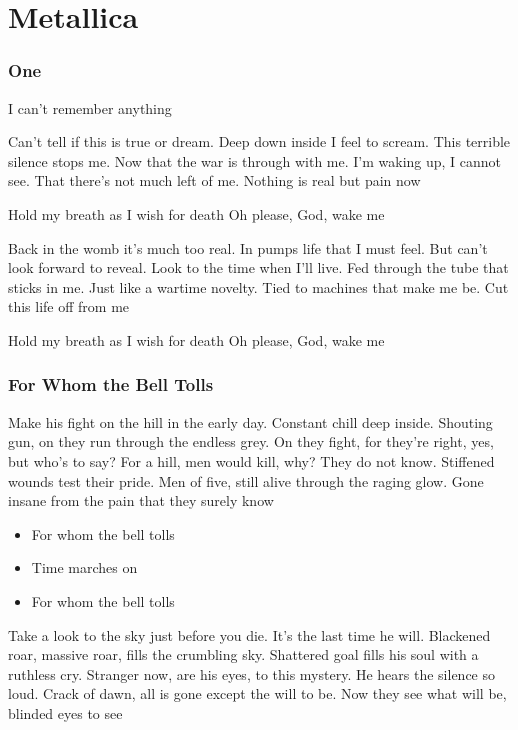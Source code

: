 \documentclass{article}
\begin{document}
\part{Metallica}
\section{One}
I can’t remember anything

Can’t tell if this is true or dream. Deep down inside I feel to scream. This terrible silence stops me. Now that the war is through with me. I’m waking up, I cannot see. That there’s not much left of me. Nothing is real but pain now


Hold my breath as I wish for death
Oh please, God, wake me


Back in the womb it’s much too real. In pumps life that I must feel. But can’t look forward to reveal. Look to the time when I’ll live. Fed through the tube that sticks in me. Just like a wartime novelty. Tied to machines that make me be. Cut this life off from me


Hold my breath as I wish for death
Oh please, God, wake me \cite{green}

\section{For Whom the Bell Tolls}

Make his fight on the hill in the early day. Constant chill deep inside. Shouting gun, on they run through the endless grey. On they fight, for they're right, yes, but who's to say? For a hill, men would kill, why? They do not know. Stiffened wounds test their pride. Men of five, still alive through the raging glow. Gone insane from the pain that they surely know

\begin{itemize}
\item For whom the bell tolls
\item Time marches on
\item For whom the bell tolls
\end{itemize}

Take a look to the sky just before you die. It's the last time he will. Blackened roar, massive roar, fills the crumbling sky. Shattered goal fills his soul with a ruthless cry. Stranger now, are his eyes, to this mystery. He hears the silence so loud. Crack of dawn, all is gone except the will to be. Now they see what will be, blinded eyes to see \cite{hysteria}
\end{document}
